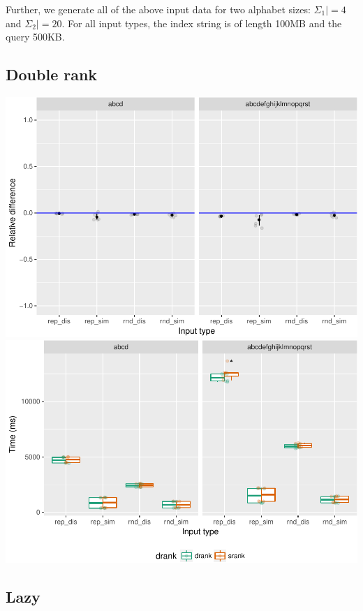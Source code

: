 \documentclass[]{article}
\begin{document}
Further, we generate all of the above input data for two alphabet sizes:
\(\Sigma_1| = 4\) and \(\Sigma_2| = 20\). For all input types, the index
string is of length 100MB and the query 500KB.

\subsection{Double rank}\label{double-rank}

\includegraphics{sea_2018_files/figure-latex/drank_plot_better-1.pdf}
\includegraphics{sea_2018_files/figure-latex/drank_plot_better-2.pdf}

\subsection{Lazy}\label{lazy}
\end{document}
